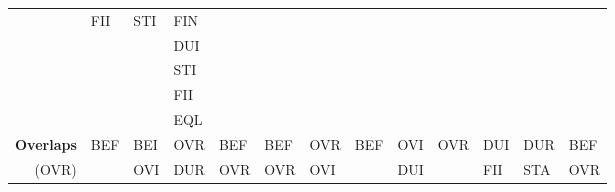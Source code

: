\documentclass[11pt]{report}
\newenvironment{vvarmargin}[2]
{
  \begin{list}{}
  {
    \setlength{\topsep}{0pt}
    \setlength{\leftmargin}{0pt}
    \setlength{\rightmargin}{0pt}
    \setlength{\listparindent}{\parindent}
    \setlength{\itemindent}{\parindent}
    \setlength{\parsep}{0pt plus 1pt}
    \addtolength{\leftmargin}{#1}\addtolength{\rightmargin}{#2}
  }
  \item
}
{
  \end{list}
}
\begin{document}
\begin{table}[p]
\begin{vvarmargin}{-4cm}{-4cm}
\begin{center}
\begin{tabular}[t]{|r|l|l|l|l|l|l|l|l|l|l|l|l|}
                                          & FII                     & STI                     & FIN                     &                         &                         &                         &                         &                         &                         &                         &                         &                         \\
                                          &                         &                         & DUI                     &                         &                         &                         &                         &                         &                         &                         &                         &                         \\
                                          &                         &                         & STI                     &                         &                         &                         &                         &                         &                         &                         &                         &                         \\
                                          &                         &                         & FII                     &                         &                         &                         &                         &                         &                         &                         &                         &                         \\
                                          &                         &                         & EQL                     &                         &                         &                         &                         &                         &                         &                         &                         &                         \\
                  \hline
                  \textbf{Overlaps}       & BEF                     & BEI                     & OVR                     & BEF                     & BEF                     & OVR                     & BEF                     & OVI                     & OVR                     & DUI                     & DUR                     & BEF                     \\
                  (OVR)                   &                         & OVI                     & DUR                     & OVR                     & OVR                     & OVI                     &                         & DUI                     &                         & FII                     & STA                     & OVR                     \\

\end{tabular}
\end{center}
\end{vvarmargin}
\end{table}
\end{document}
